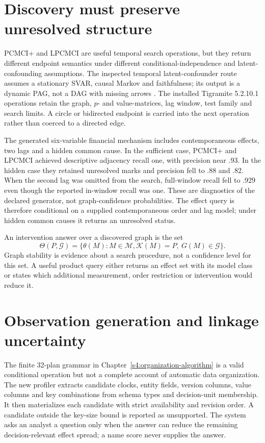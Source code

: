 \section{Discovery must preserve unresolved structure}
\label{s5:discovery}

PCMCI+ and LPCMCI are useful temporal search operations, but they return
different endpoint semantics under different conditional-independence and
latent-confounding assumptions. The inspected temporal latent-confounder
route assumes a stationary SVAR, causal Markov and faithfulness; its output is
a dynamic PAG, not a DAG with missing arrows \citep{rohekar2023}. The installed
Tigramite 5.2.10.1 operations retain the graph, $p$- and value-matrices, lag
window, test family and search limits. A circle or bidirected endpoint is
carried into the next operation rather than coerced to a directed edge.

The generated six-variable financial mechanism includes contemporaneous
effects, two lags and a hidden common cause. In the sufficient case, PCMCI+
and LPCMCI achieved descriptive adjacency recall one, with precision near
.93. In the hidden case they retained unresolved marks and precision fell to
.88 and .82. When the second lag was omitted from the search, full-window
recall fell to .929 even though the reported in-window recall was one. These
are diagnostics of the declared generator, not graph-confidence probabilities.
The effect query is therefore conditional on a supplied contemporaneous order
and lag model; under hidden common causes it returns an unresolved status.

An intervention answer over a discovered graph is the set
\[
 \Theta(P,\mathcal G)=\{\theta(M):M\in\mathcal M,
   \mathcal K(M)=P,\ G(M)\in\mathcal G\}.
\]
Graph stability is evidence about a search procedure, not a confidence level
for this set. A useful product query either returns an effect set with its
model class or states which additional measurement, order restriction or
intervention would reduce it.

\section{Observation generation and linkage uncertainty}
\label{s5:observation-generation}

The finite 32-plan grammar in Chapter~\ref{s4:organization-algorithm} is a
valid conditional operation but not a complete account of automatic data
organization. The new profiler extracts candidate clocks, entity fields,
version columns, value columns and key combinations from schema types and
decision-unit membership. It then materializes each candidate with strict
availability and revision order. A candidate outside the key-size bound is
reported as unsupported. The system asks an analyst a question only when the
answer can reduce the remaining decision-relevant effect spread; a name score
never supplies the answer.


